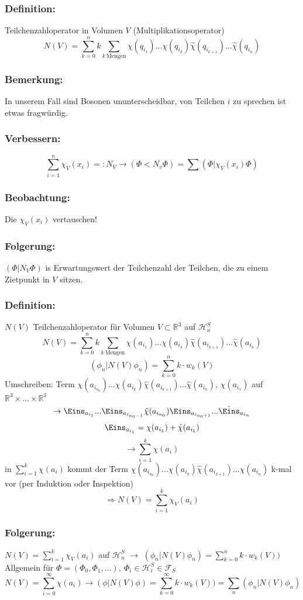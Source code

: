 \documentclass[twoside,a4paper]{scrartcl}
\newcommand{\R}{\mathbb{R}}
\renewcommand{\1}{\mathds{1}}
\newcommand{\Ra}{\Rightarrow}
\newcommand{\ra}{\rightarrow}
\renewcommand{\H}{\mathcal{H}}
\newcommand{\F}{\mathcal{F}}
\renewcommand{\R}{\mathbb{R}}
\begin{document}
\subsubsection*{Definition:}
Teilchenzahloperator in Volumen $V$ (Multiplikationsoperator)
$$N(V)=\sum_{k=0}^n k \sum_{k \ \mathrm{Mengen}}\chi(q_{i_1})...\chi(q_{i_k})\hat \chi(q_{i_{k+1}})...\hat \chi(q_{i_n})$$

\subsubsection*{Bemerkung:}
In unserem Fall sind Bosonen ununterscheidbar, von Teilchen $i$ zu sprechen ist etwas fragwürdig.
\subsubsection*{Verbessern:}
 $$\sum_{i=1}^n \chi_V(x_i)=:N_V \ra (\Phi<N_v \Phi)=\sum (\Phi|\chi_V(x_i)\Phi)$$
\subsubsection*{Beobachtung:}
Die $\chi_V(x_i)$ vertauschen!
\subsubsection*{Folgerung:}
$(\Phi|N_V\Phi)$ is Erwartungswert der Teilchenzahl der Teilchen, die zu einem Zietpunkt in $V$ sitzen.

\subsubsection*{Definition:}
$N(V)$ Teilchenzahloperator für Volumen $V\subset \R^3$ auf $\H_n^S$
$$N(V)=\sum_{k=0}^n k \sum_{k \ \mathrm{Mengen}}\chi(a_{i_1})...\chi(a_{i_k})\hat \chi(a_{i_{k+1}})...\hat \chi(a_{i_n})$$
$$(\phi_n|N(V)\phi_n)=\sum_{k=0}^n k \cdot w_k(V)$$
Umschreiben: Term $\chi(a_{i_{n_0}})...\chi(a_{i_k})\hat \chi(a_{i_{k+1}})...\hat \chi(a_{i_n})$, $\chi(a_{i_1})$ auf $\R^3 \times ... \times \R^3$
$$\ra \Eins_{a_{i_1}}...\Eins_{a_{i_{n_0-1}}}\hat \chi(a_{i_{n_0}})\Eins_{a_{i_{n_0+1}}}...\hat \Eins_{a_{i_n}}$$
$$\Eins_{a_{i_1}}=\chi(a_{i_1})+\hat \chi(a_{i_1})$$
$$\ra \sum_{i=1}^k \chi(a_i)$$
in $\sum_{i=1}^k \chi(a_i)$ kommt der Term $\chi(a_{i_{n_0}})...\chi(a_{i_k})\hat \chi(a_{i_{k+1}})...\hat \chi(a_{i_n})$ k-mal vor (per Induktion oder Inspektion)
$$\Ra N(V)=\sum_{i=1}^k \chi_V(a_i)$$
\subsubsection*{Folgerung:}
$N(V)=\sum_{i=1}^k \chi_V(a_i)$ auf $\H_n^S$ $\ra$ $(\phi_n|N(V)\phi_n)=\sum_{k=0}^n k \cdot w_k(V))$\\
Allgemein für $\Phi=(\Phi_0,\Phi_1,...), \ \Phi_i \in \H_i^S \in \F_S$
$$N(V)=\sum_{i=0}^\infty \chi(a_i) \ra (\phi|N(V)\phi)=\sum_{k=0}^\infty k \cdot w_k(V))=\sum_n (\phi_n|N(V)\phi_n)$$
\end{document}
